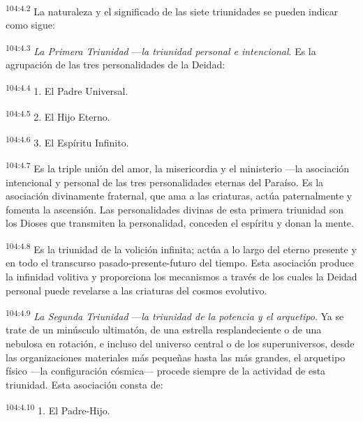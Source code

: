 \documentclass[twoside, 11pt]{book}
\begin{document}
\par
\textsuperscript{104:4.2} La naturaleza y el significado de las siete triunidades se pueden indicar como sigue:

\par
\textsuperscript{104:4.3} \textit{La Primera Triunidad} ---\textit{la triunidad personal e intencional}. Es la agrupación de las tres personalidades de la Deidad:

\par
\textsuperscript{104:4.4} 1. El Padre Universal.

\par
\textsuperscript{104:4.5} 2. El Hijo Eterno.

\par
\textsuperscript{104:4.6} 3. El Espíritu Infinito.

\par
\textsuperscript{104:4.7} Es la triple unión del amor, la misericordia y el ministerio ---la asociación intencional y personal de las tres personalidades eternas del Paraíso. Es la asociación divinamente fraternal, que ama a las criaturas, actúa paternalmente y fomenta la ascensión. Las personalidades divinas de esta primera triunidad son los Dioses que transmiten la personalidad, conceden el espíritu y donan la mente.

\par
\textsuperscript{104:4.8} Es la triunidad de la volición infinita; actúa a lo largo del eterno presente y en todo el transcurso pasado-presente-futuro del tiempo. Esta asociación produce la infinidad volitiva y proporciona los mecanismos a través de los cuales la Deidad personal puede revelarse a las criaturas del cosmos evolutivo.

\par
\textsuperscript{104:4.9} \textit{La Segunda Triunidad} ---\textit{la triunidad de la potencia y el arquetipo}. Ya se trate de un minúsculo ultimatón, de una estrella resplandeciente o de una nebulosa en rotación, e incluso del universo central o de los superuniversos, desde las organizaciones materiales más pequeñas hasta las más grandes, el arquetipo físico ---la configuración cósmica--- procede siempre de la actividad de esta triunidad. Esta asociación consta de:

\par
\textsuperscript{104:4.10} 1. El Padre-Hijo.
\end{document}

